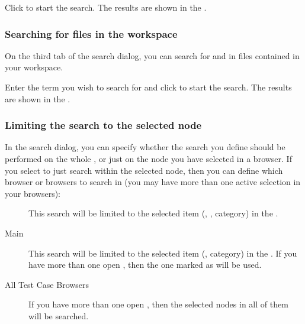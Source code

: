 Click  to start the search. The results are shown in the \gdsearchresultview{} . 


\subsubsection{Searching for files in the workspace}
\label{TasksSearchFiles}

On the third tab of the search dialog, you can search for and in files contained in your workspace.

Enter the term you wish to search for and click  to start the search. The results are shown in the \gdsearchresultview{} . 

\subsubsection{Limiting the search to the selected node}
\label{TasksSearchLimit}

In the search dialog, you can specify whether the search you define should be performed on the whole \gdproject{}, or just on the node you have selected in a browser. If you select to just search within the selected node, then you can define which browser or browsers to search in (you may have more than one active selection in your browsers):

\begin{description}
\item [\gdtestsuitebrowser{}]{This search will be limited to the selected item (\gdsuite{}, \gdjob{}, category) in the \gdtestsuitebrowser{}. }
\item [Main \gdtestcasebrowser{}]{This search will be limited to the selected item (\gdcase{}, category) in the \gdtestcasebrowser{}. If you have more than one \gdtestcasebrowser{} open , then the one marked as  will be used. }
\item [All Test Case Browsers]{If you have more than one \gdtestcasebrowser{} open , then the selected nodes in all of them will be searched. }
\end{description}

